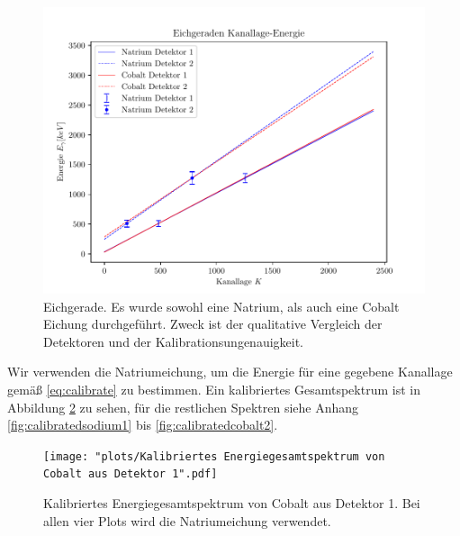 \documentclass[%
aps,
onecolumn,
11pt,
tightenlines,
nofootinbib,
superscriptaddress,
floatfix,
prd,
]{revtex4-2}
\begin{document}
%

\begin{figure}[H]
	\centering
	\includegraphics[scale=.9]{plots/Eichgeraden.pdf}
	\caption{Eichgerade. Es wurde sowohl eine Natrium, als auch eine Cobalt Eichung durchgeführt. Zweck ist der qualitative Vergleich der Detektoren und der Kalibrationsungenauigkeit.}
	\label{fig:calibratecurve}
\end{figure}
Wir verwenden die Natriumeichung, um die Energie für eine gegebene Kanallage gemäß \ref{eq:calibrate} zu bestimmen. Ein kalibriertes Gesamtspektrum ist in Abbildung \ref{fig:calibratespectrum} zu sehen, für die restlichen Spektren siehe Anhang \ref{fig:calibratedsodium1} bis \ref{fig:calibratedcobalt2}. 
\begin{figure}[H]
	\centering
	\texttt{[image: "plots/Kalibriertes Energiegesamtspektrum von Cobalt aus Detektor 1".pdf]}
	\caption{Kalibriertes Energiegesamtspektrum von Cobalt aus Detektor 1. Bei allen vier Plots wird die Natriumeichung verwendet.}
	\label{fig:calibratespectrum}
\end{figure}
\newpage
\end{document}
